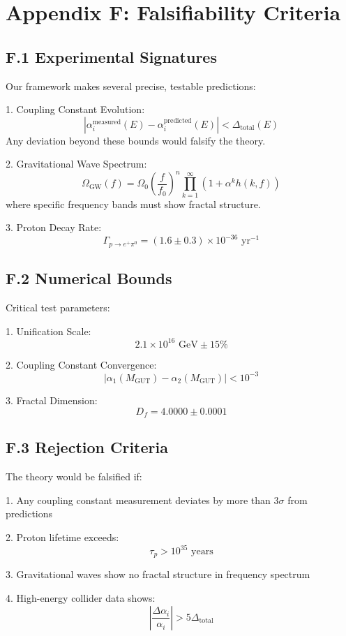 \section*{Appendix F: Falsifiability Criteria}
\label{app:falsifiability}

\subsection*{F.1 Experimental Signatures}
\label{subsec:experimental_signatures}

Our framework makes several precise, testable predictions:

1. Coupling Constant Evolution:
   \[
   |\alpha_i^{\text{measured}}(E) - \alpha_i^{\text{predicted}}(E)| < \Delta_{\text{total}}(E)
   \]
   Any deviation beyond these bounds would falsify the theory.

2. Gravitational Wave Spectrum:
   \[
   \Omega_{\text{GW}}(f) = \Omega_0\left(\frac{f}{f_0}\right)^n \prod_{k=1}^{\infty} \left(1 + \alpha^k h(k,f)\right)
   \]
   where specific frequency bands must show fractal structure.

3. Proton Decay Rate:
   \[
   \Gamma_{p\to e^+\pi^0} = (1.6 \pm 0.3) \times 10^{-36} \text{ yr}^{-1}
   \]

\subsection*{F.2 Numerical Bounds}
\label{subsec:numerical_bounds}

Critical test parameters:

1. Unification Scale:
   \[
   2.1 \times 10^{16} \text{ GeV} \pm 15\%
   \]

2. Coupling Constant Convergence:
   \[
   |\alpha_1(M_{\text{GUT}}) - \alpha_2(M_{\text{GUT}})| < 10^{-3}
   \]

3. Fractal Dimension:
   \[
   D_f = 4.0000 \pm 0.0001
   \]

\subsection*{F.3 Rejection Criteria}
\label{subsec:rejection_criteria}

The theory would be falsified if:

1. Any coupling constant measurement deviates by more than $3\sigma$ from predictions

2. Proton lifetime exceeds:
   \[
   \tau_p > 10^{35} \text{ years}
   \]

3. Gravitational waves show no fractal structure in frequency spectrum

4. High-energy collider data shows:
   \[
   \left|\frac{\Delta\alpha_i}{\alpha_i}\right| > 5\Delta_{\text{total}}
   \] 